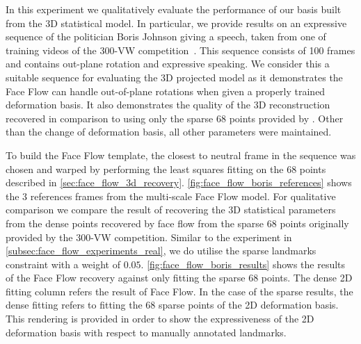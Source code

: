 In this experiment we qualitatively evaluate the performance of our basis
built from the 3D statistical model. In particular, we provide results on
an expressive sequence of the politician Boris Johnson giving a speech, taken
from one of training videos of the 
300-VW competition~\cite{Chrysos:2015gt,shen2015first}. This sequence consists
of 100 frames and contains out-plane rotation and expressive speaking. We
consider this a suitable sequence for evaluating the 3D projected model
as it demonstrates the Face Flow can handle out-of-plane rotations when
given a properly trained deformation basis. It also demonstrates the quality
of the 3D reconstruction recovered in comparison to using only the sparse
68 points provided by \citet{shen2015first}. Other than the change of deformation
basis, all other parameters were maintained.

To build the Face Flow template, the closest to neutral frame in the sequence 
was chosen and warped by performing the least squares fitting on the 68 
points described in \cref{sec:face_flow_3d_recovery}. 
\cref{fig:face_flow_boris_references} shows the 3 references frames from 
the multi-scale Face Flow model. For qualitative comparison we compare the result
of recovering the 3D statistical parameters from the dense points recovered by
face flow from the sparse 68 points originally provided by the 300-VW competition.
Similar to the experiment in \cref{subsec:face_flow_experiments_real}, we do
utilise the sparse landmarks constraint with a weight of $0.05$. 
\cref{fig:face_flow_boris_results} shows the results of the Face Flow recovery
against only fitting the sparse 68 points. The dense 2D fitting column refers
the result of Face Flow. In the case of the sparse results, the dense fitting
refers to fitting the 68 sparse points of the 2D deformation basis. This
rendering is provided in order to show the expressiveness of the 2D deformation
basis with respect to manually annotated landmarks.

